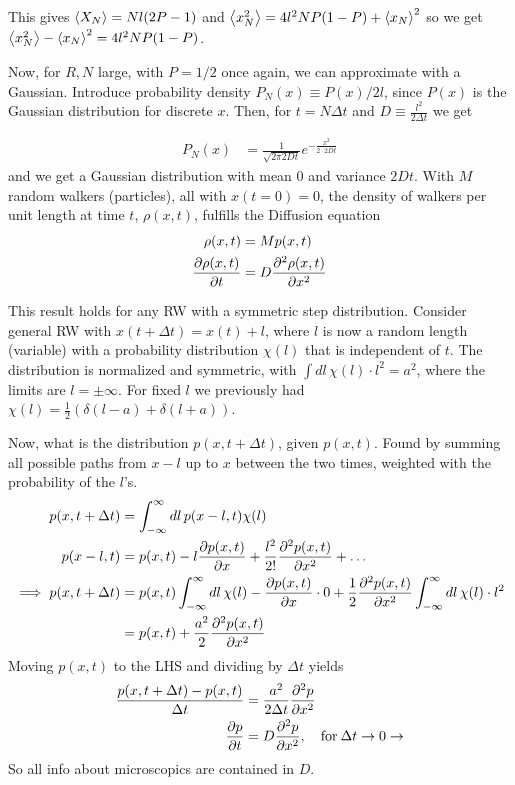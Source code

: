 \documentclass[a4paper, english, 12pt]{article}
\begin{document}
\begin{multicols*}{2}
This gives $\expval{X_N}=Nl(2P-1)$ and $\expval{x_N^2}=4l^2 NP(1-P) + \expval{x_N}^2$ so we get $\expval{x_N^2} - \expval{x_N}^2 = 4l^2 N P(1-P)$.

Now, for $R,N$ large, with $P=1/2$ once again, we can approximate with a Gaussian. Introduce probability density $P_N(x)\equiv P(x)/2l$, since $P(x)$ is the Gaussian distribution for discrete $x$. Then, for $t=N\Delta t$ and $D\equiv \frac{l^2}{2\Delta t}$ we get 

\begin{align*}
    P_N(x) &= \frac{1}{\sqrt{2\pi 2Dt}} e^{-\frac{x^2}{2\cdot 2Dt}}
\end{align*}
and we get a Gaussian distribution with mean $0$ and variance $2Dt$. With $M$ random walkers (particles), all with $x(t=0)=0$, the density of walkers per unit length at time $t$, $\rho(x,t)$, fulfills the Diffusion equation 
\begin{align*}
    \rho(x,t) &= M p(x,t) \\ 
    \pdv{\rho(x,t)}{t} &= D \pdv[2]{\rho(x,t)}{x}
\end{align*}


This result holds for any RW with a symmetric step distribution. Consider general RW with $x(t+\Delta t)=x(t)+l$, where $l$ is now a random length (variable) with a probability distribution $\chi(l)$ that is independent of $t$. The distribution is normalized and symmetric, with $\int dl\,\chi(l)\cdot l^2=a^2$, where the limits are $l=\pm\infty$. For fixed $l$ we previously had $\chi(l)=\frac{1}{2}(\delta(l-a) + \delta(l+a))$. 

Now, what is the distribution $p(x,t+\Delta t)$, given $p(x,t)$. Found by summing all possible paths from $x-l$ up to $x$ between the two times, weighted with the probability of the $l$'s. 
\begin{align*}
    p(x,t+\Delta t) &= \int_{-\infty}^\infty dl\, p(x-l,t)\chi(l) \\ 
    p(x-l,t) &= p(x,t) - l \pdv{p(x,t)}{x} + \frac{l^2}{2!}\pdv[2]{p(x,t)}{x} + \dots \\ 
    \implies p(x,t+\Delta t) &= p(x,t)\int_{-\infty}^\infty dl\,\chi(l) - \pdv{p(x,t)}{x} \cdot 0 + \frac{1}{2} \pdv[2]{p(x,t)}{x} \int_{-\infty}^\infty dl\,\chi(l)\cdot l^2 \\ 
    &= p(x,t) + \frac{a^2}{2} \pdv[2]{p(x,t)}{x}
\end{align*}
Moving $p(x,t)$ to the LHS and dividing by $\Delta t$ yields 
\begin{align*}
    \frac{p(x,t+\Delta t) - p(x,t)}{\Delta t} &= \frac{a^2}{2\Delta t} \pdv[2]{p}{x} \\ 
    \pdv{p}{t} &= D \pdv[2]{p}{x},\quad \text{for}\: \Delta t \to 0 \to
\end{align*}
So all info about microscopics are contained in $D$. 




\end{multicols*}
\end{document}
